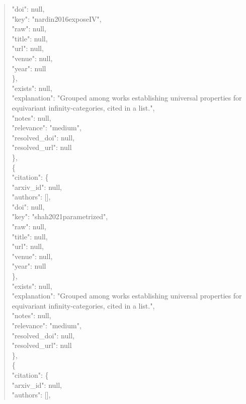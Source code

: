 \documentclass[11pt]{article}
\begin{document}
\begin{quote}
        "doi": null,\\
        "key": "nardin2016exposeIV",\\
        "raw": null,\\
        "title": null,\\
        "url": null,\\
        "venue": null,\\
        "year": null\\
      \},\\
      "exists": null,\\
      "explanation": "Grouped among works establishing universal properties for equivariant infinity-categories, cited in a list.",\\
      "notes": null,\\
      "relevance": "medium",\\
      "resolved\_doi": null,\\
      "resolved\_url": null\\
    \},\\
    \{\\
      "citation": \{\\
        "arxiv\_id": null,\\
        "authors": [],\\
        "doi": null,\\
        "key": "shah2021parametrized",\\
        "raw": null,\\
        "title": null,\\
        "url": null,\\
        "venue": null,\\
        "year": null\\
      \},\\
      "exists": null,\\
      "explanation": "Grouped among works establishing universal properties for equivariant infinity-categories, cited in a list.",\\
      "notes": null,\\
      "relevance": "medium",\\
      "resolved\_doi": null,\\
      "resolved\_url": null\\
    \},\\
    \{\\
      "citation": \{\\
        "arxiv\_id": null,\\
        "authors": [],\\

\end{quote}
\end{document}
